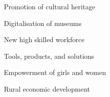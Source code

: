 \item Promotion of cultural heritage
\item Digitalisation of museums
\item New high skilled workforce
\item Tools, products, and solutions
\item Empowerment of girls and women
\item Rural economic development
